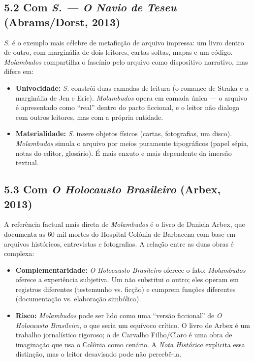 \documentclass[14pt,openany]{extbook}
\begin{document}
\subsection*{5.2 Com \textit{S. --- O Navio de Teseu} (Abrams/Dorst, 2013)}

\textit{S.} é o exemplo mais célebre de metaficção de arquivo impressa: um livro dentro de outro, com marginália de dois leitores, cartas soltas, mapas e um código. \textit{Molambudos} compartilha o fascínio pelo arquivo como dispositivo narrativo, mas difere em:

\begin{itemize}
\item \textbf{Univocidade:} \textit{S.} constrói duas camadas de leitura (o romance de Straka e a marginália de Jen e Eric). \textit{Molambudos} opera em camada única --- o arquivo é apresentado como ``real'' dentro do pacto ficcional, e o leitor não dialoga com outros leitores, mas com a própria entidade.
\item \textbf{Materialidade:} \textit{S.} insere objetos físicos (cartas, fotografias, um disco). \textit{Molambudos} simula o arquivo por meios puramente tipográficos (papel sépia, notas do editor, glosário). É mais enxuto e mais dependente da imersão textual.
\end{itemize}

\subsection*{5.3 Com \textit{O Holocausto Brasileiro} (Arbex, 2013)}

A referência factual mais direta de \textit{Molambudos} é o livro de Daniela Arbex, que documenta as 60 mil mortes do Hospital Colônia de Barbacena com base em arquivos históricos, entrevistas e fotografias. A relação entre as duas obras é complexa:

\begin{itemize}
\item \textbf{Complementaridade:} \textit{O Holocausto Brasileiro} oferece o fato; \textit{Molambudos} oferece a experiência subjetiva. Um não substitui o outro; eles operam em registros diferentes (testemunho vs. ficção) e cumprem funções diferentes (documentação vs. elaboração simbólica).
\item \textbf{Risco:} \textit{Molambudos} pode ser lido como uma ``versão ficcional'' de \textit{O Holocausto Brasileiro}, o que seria um equívoco crítico. O livro de Arbex é um trabalho jornalístico rigoroso; o de Carvalho Filho/Claro é uma obra de imaginação que usa o Colônia como cenário. A \textit{Nota Histórica} explicita essa distinção, mas o leitor desavisado pode não percebê-la.
\end{itemize}
\end{document}
